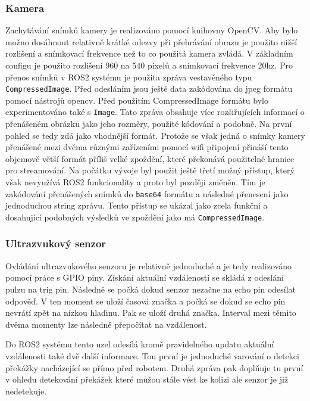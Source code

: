 \subsubsection*{Kamera}
Zachytávání snímků kamery je realizováno pomocí knihovny OpenCV. Aby bylo možno dosáhnout relativně krátké odezvy při přehrávání obrazu je použito nižší rozlišení a snímkovací frekvence než to co použitá kamera zvládá. V základním configu je použito rozlišení 960 na 540 pixelů a snímkovací frekvence 20hz.
Pro přenos snímků v ROS2 systému je použita zpráva vestavěného typu \verb|CompressedImage|. Před odesláním jsou ještě data zakódována do jpeg formátu pomocí nástrojů opencv.
Před použitím CompressedImage formátu bylo experimentováno také s \verb|Image|. Tato zpráva obsahuje více rozšiřujících informací o přenášeném obrázku jako jeho rozměry, použité kódování a podobně. Na první pohled se tedy zdá jako vhodnější formát. Protože se však jedná o snímky kamery přenášené mezi dvěma různými zařízeními pomocí wifi připojení přináší tento objemově větší formát příliš velké zpoždění, které překonává použitelné hranice pro streamování. Na počátku vývoje byl použit ještě třetí možný přístup, který však nevyužívá ROS2 funkcionality a proto byl později změněn. Tím je zakódování přenášených snímků do \verb|base64| formátu a následné přenesení jako jednoduchou string zprávu. Tento přístup se ukázal jako zcela funkční a dosahující podobných výsledků ve zpoždění jako má \verb|CompressedImage|.
 
\subsubsection*{Ultrazvukový senzor}
Ovládání ultrazvukového senzoru je relativně jednoduché a je tedy realizováno pomocí práce s GPIO piny. Získání aktuální vzdálenosti se skládá z odeslání pulzu na trig pin. Následně se počká dokud senzor nezačne na echo pin odesílat odpověď. V ten moment se uloží časová značka a počká se dokud se echo pin nevrátí zpět na nízkou hladinu. Pak se uloží druhá značka. Interval mezi těmito dvěma momenty lze následně přepočítat na vzdálenost.

Do ROS2 systému tento uzel odesílá kromě pravidelného updatu aktuální vzdálenosti také dvě další informace. Tou první je jednoduché varování o detekci překážky nacházející se přímo před robotem. Druhá zpráva pak doplňuje tu první v ohledu detekování překážek které můžou stále vést ke kolizi ale senzor je již nedetekuje. 

